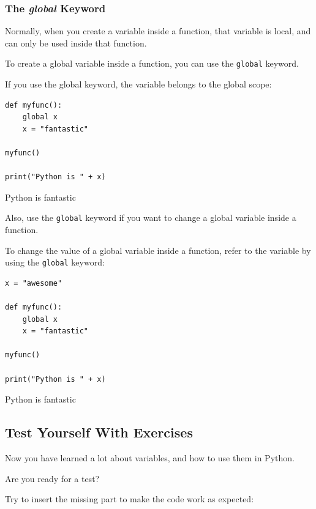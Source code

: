 \documentclass[12pt,a4paper]{article}
\newcommand{\code}[1]{%
	\colorbox{backcolour}{\lstinline{#1}}%
}
\begin{document}
\subsubsection{The \textit{global} Keyword}

Normally, when you create a variable inside a function, that variable is local,
and can only be used inside that function.

To create a global variable inside a function, you can use the \code{global} keyword.

\begin{ebox}
	If you use the global keyword, the variable belongs to the global scope:

	\begin{lstlisting}
def myfunc():
    global x
    x = "fantastic"

myfunc()

print("Python is " + x)
	\end{lstlisting}
\tcblower
	\begin{vercode}
Python is fantastic
	\end{vercode}
\end{ebox}

Also, use the \code{global} keyword if you want to change a global variable
inside a function.

\begin{ebox}
	To change the value of a global variable inside a function, refer to the
	variable by using the \code{global} keyword:

	\begin{lstlisting}
x = "awesome"

def myfunc():
    global x
    x = "fantastic"

myfunc()

print("Python is " + x)
	\end{lstlisting}
\tcblower
	\begin{vercode}
Python is fantastic
	\end{vercode}
\end{ebox}

\subsection{Test Yourself With Exercises}

Now you have learned a lot about variables, and how to use them in Python.

Are you ready for a test?

Try to insert the missing part to make the code work as expected:
\end{document}

